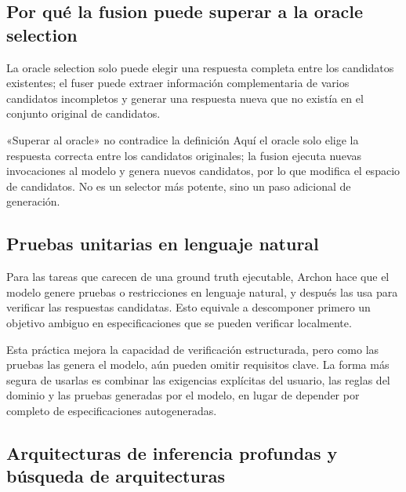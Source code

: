 \subsection{Por qué la fusion puede superar a la oracle selection}

La oracle selection solo puede elegir una respuesta completa entre los candidatos existentes; el fuser puede extraer información complementaria de varios candidatos incompletos y generar una respuesta nueva que no existía en el conjunto original de candidatos.


\begin{warningbox}{«Superar al oracle» no contradice la definición}
Aquí el oracle solo elige la respuesta correcta entre los candidatos originales; la fusion ejecuta nuevas invocaciones al modelo y genera nuevos candidatos, por lo que modifica el espacio de candidatos. No es un selector más potente, sino un paso adicional de generación.
\end{warningbox}

\subsection{Pruebas unitarias en lenguaje natural}

Para las tareas que carecen de una ground truth ejecutable, Archon hace que el modelo genere pruebas o restricciones en lenguaje natural, y después las usa para verificar las respuestas candidatas. Esto equivale a descomponer primero un objetivo ambiguo en especificaciones que se pueden verificar localmente.


Esta práctica mejora la capacidad de verificación estructurada, pero como las pruebas las genera el modelo, aún pueden omitir requisitos clave. La forma más segura de usarlas es combinar las exigencias explícitas del usuario, las reglas del dominio y las pruebas generadas por el modelo, en lugar de depender por completo de especificaciones autogeneradas.

\subsection{Arquitecturas de inferencia profundas y búsqueda de arquitecturas}

